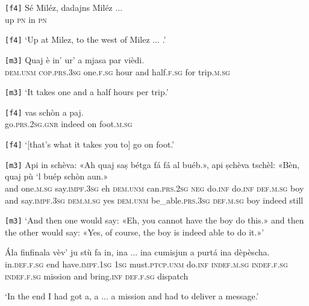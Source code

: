 \begin{linenumbers}
	\gll \texttt{[f4]} Sé Miléz, dadajns Miléz ... \\
	{} up \textsc{pn} in \textsc{pn}\\
\end{linenumbers}
\medskip
\glt \texttt{[f4]} `Up at Milez, to the west of Milez ... .'
\medskip

\begin{linenumbers}
	\gll \texttt{[m3]} Quaj è in’ ur’ a mjasa par vièdi.  \\
	{} \textsc{dem.unm} \textsc{cop.prs.3sg} one.\textsc{f.sg} hour and half.\textsc{f.sg} for trip.\textsc{m.sg}\\
\end{linenumbers}
\medskip
\glt \texttt{[m3]} `It takes one and a half hours per trip.'
\medskip

\begin{linenumbers}
	\gll \texttt{[f4]} vas schòn a paj.   \\
	{} go.\textsc{prs.2sg.gnr} indeed on foot.\textsc{m.sg} \\
\end{linenumbers}
\medskip
\glt \texttt{[f4]} `[that's what it takes you to] go on foot.'
\medskip

\begin{linenumbers}
	\gll \texttt{[m3]} Api in schèva: «Ah quaj saṣ  bétga fá fá al buéb.», api ṣchèva tschèl: «Bèn, quaj pù `l buép schòn aun.»   \\
	{} and one.\textsc{m.sg} say.\textsc{impf.3sg} eh \textsc{dem.unm} can.\textsc{prs.2sg} \textsc{neg} do.\textsc{inf} do.\textsc{inf} \textsc{def.m.sg} boy and say.\textsc{impf.3sg} \textsc{dem.m.sg} yes \textsc{dem.unm} be\_able.\textsc{prs.3sg} \textsc{def.m.sg} boy indeed still\\
\end{linenumbers}
\medskip
\glt \texttt{[m3]} `And then one would say: «Eh, you cannot have the boy do this.» and then the other would say: «Yes, of course, the boy is indeed able to do it.»'
\medskip

\begin{linenumbers}
	\gll Ála finfinala vèv' ju stù fa in, ina ... ina cumisjun a purtá ina dèpèscha.\\
	in.\textsc{def.f.sg} end have.\textsc{impf.1sg} \textsc{1sg}  must.\textsc{ptcp.unm} do.\textsc{inf} \textsc{indef.m.sg} \textsc{indef.f.sg} {}  \textsc{indef.f.sg} mission and bring.\textsc{inf} \textsc{def.f.sg} dispatch\\
\end{linenumbers}
\medskip
\glt `In the end I had got a, a ... a mission and had to deliver a message.'
\medskip


